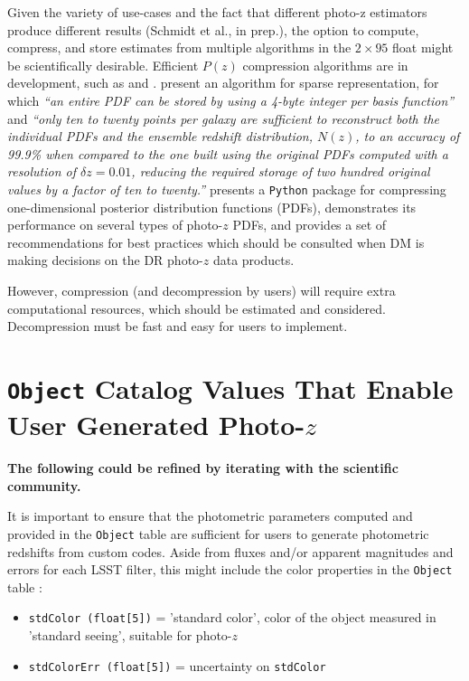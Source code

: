\documentclass[DM,lsstdraft,toc]{lsstdoc}
\begin{document}
Given the variety of use-cases and the fact that different photo-z estimators produce different results (Schmidt et al., in prep.), the option to compute, compress, and store estimates from multiple algorithms in the $2\times95$ float might be scientifically desirable.
Efficient $P(z)$ compression algorithms are in development, such as \citet{2014MNRAS.441.3550C} and \citet{2018AJ....156...35M}.
\citet{2014MNRAS.441.3550C} present an algorithm for sparse representation, for which {\it ``an entire PDF can be stored by using a 4-byte integer per basis function''} and {\it ``only ten to twenty points per galaxy are sufficient to reconstruct both the individual PDFs and the ensemble redshift distribution, $N(z)$, to an accuracy of 99.9\% when compared to the one built using the original PDFs computed with a resolution of $\delta z = 0.01$, reducing the required storage of two hundred original values by a factor of ten to twenty.''} 
\citet{2018AJ....156...35M} presents a {\tt Python} package for compressing one-dimensional posterior distribution functions (PDFs), demonstrates its performance on several types of photo-$z$ PDFs, and provides a set of recommendations for best practices which should be consulted when DM is making decisions on the DR photo-$z$ data products.

However, compression (and decompression by users) will require extra computational resources, which should be estimated and considered.
Decompression must be fast and easy for users to implement.


\section{{\tt Object} Catalog Values That Enable User Generated Photo-$z$}\label{sec:ugpz}

{\bf The following could be refined by iterating with the scientific community.}

It is important to ensure that the photometric parameters computed and provided in the {\tt Object} table are sufficient for users to generate photometric redshifts from custom codes.
Aside from fluxes and/or apparent magnitudes and errors for each LSST filter, this might include the color properties in the {\tt Object} table : 

\begin{itemize}[noitemsep,topsep=-10pt]
\item \texttt{stdColor (float[5])} = 'standard color', color of the object measured in 'standard seeing', suitable for photo-$z$
\item \texttt{stdColorErr (float[5])} = uncertainty on \texttt{stdColor}
\end{itemize}
\end{document}
